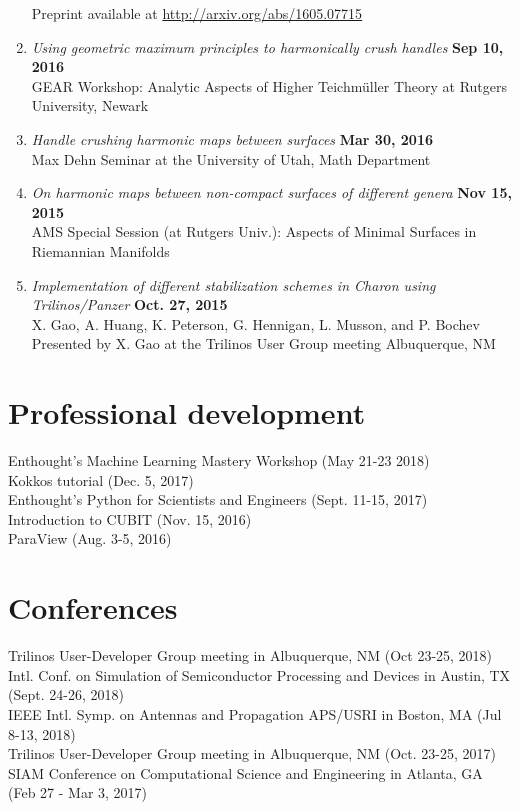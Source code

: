 \documentclass[margin,line]{res}
\begin{document}
\begin{resume}
\begin{enumerate}
      Preprint available at \url{http://arxiv.org/abs/1605.07715}
\item {\em Using geometric maximum principles to harmonically crush handles} \hfill {\bf Sep 10, 2016} \\
      GEAR Workshop: Analytic Aspects of Higher Teichm\"uller Theory at Rutgers University, Newark
\item {\em Handle crushing harmonic maps between surfaces} \hfill {\bf Mar 30, 2016} \\
      Max Dehn Seminar at the University of Utah, Math Department
\item {\em On harmonic maps between non-compact surfaces of different genera} \hfill {\bf Nov 15, 2015} \\
      AMS Special Session (at Rutgers Univ.): Aspects of Minimal Surfaces in Riemannian Manifolds
\item {\em Implementation of different stabilization schemes in Charon using Trilinos/Panzer} \hfill{ \bf Oct. 27, 2015} \\
      X. Gao, A. Huang, K. Peterson, G. Hennigan, L. Musson, and P. Bochev \\
      Presented by X. Gao at the Trilinos User Group meeting Albuquerque, NM
\end{enumerate}

\section{\sc Professional development}
Enthought's Machine Learning Mastery Workshop (May 21-23 2018)\\
Kokkos tutorial (Dec. 5, 2017)\\
Enthought's Python for Scientists and Engineers (Sept. 11-15, 2017)\\
Introduction to CUBIT (Nov. 15, 2016)\\
ParaView (Aug. 3-5, 2016)

\section{\sc Conferences}
Trilinos User-Developer Group meeting in Albuquerque, NM (Oct 23-25, 2018)\\
Intl. Conf. on Simulation of Semiconductor Processing and Devices in Austin, TX (Sept. 24-26, 2018)\\
IEEE Intl. Symp. on Antennas and Propagation APS/USRI in Boston, MA (Jul 8-13, 2018)\\
Trilinos User-Developer Group meeting in Albuquerque, NM (Oct. 23-25, 2017)\\
SIAM Conference on Computational Science and Engineering in Atlanta, GA (Feb 27 - Mar 3, 2017)


\end{resume}
\end{document}
